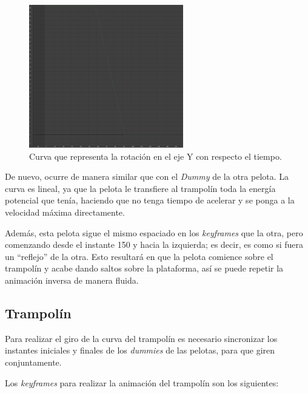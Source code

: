 \documentclass{article}
\begin{document}
\begin{figure}[H]
    \centering
    \includegraphics[width=0.6\textwidth]{imagenes/curvas/PR/dummy/green.png}
    \caption{Curva que representa la rotación en el eje Y con respecto el tiempo.}
 \end{figure}

De nuevo, ocurre de manera similar que con el \textit{Dummy} de la otra pelota. La curva es lineal, ya que la pelota le transfiere al trampolín toda la energía potencial que tenía, haciendo que no tenga tiempo de acelerar y se ponga a la velocidad máxima directamente.

\bigskip

Además, esta pelota sigue el mismo espaciado en los \textit{keyframes} que la otra, pero comenzando desde el instante 150 y hacia la izquierda; es decir, es como si fuera un ``reflejo'' de la otra. Esto resultará en que la pelota comience sobre el trampolín y acabe dando saltos sobre la plataforma, así se puede repetir la animación inversa de manera fluida.
\subsection{Trampolín}
Para realizar el giro de la curva del trampolín es necesario sincronizar los instantes iniciales y finales de los \textit{dummies} de las pelotas, para que giren conjuntamente.

\bigskip

Los \textit{keyframes} para realizar la animación del trampolín son los siguientes:
\end{document}
